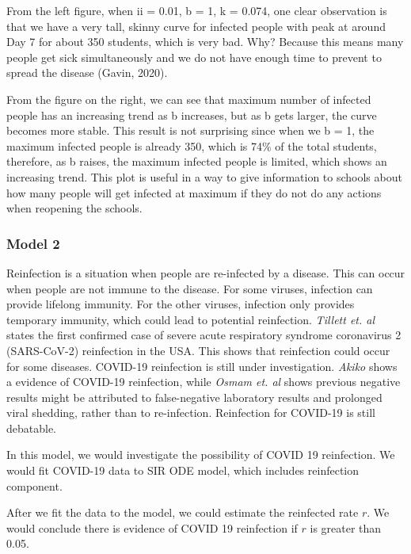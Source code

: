\documentclass[11pt,a4paper]{article}
\begin{document}
\medskip \noindent
From the left figure, when ii = 0.01, b = 1, k = 0.074, one clear observation is that we have a very tall, skinny curve for infected people with peak at around Day 7 for about 350 students, which is very bad. Why? Because this means many people get sick simultaneously and we do not have enough time to prevent to spread the disease (Gavin, 2020). 

\medskip \noindent
From the figure on the right, we can see that maximum number of infected people has an increasing trend as b increases, but as b gets larger, the curve becomes more stable. This result is not surprising since when we b = 1, the maximum infected people is already 350, which is 74\% of the total students, therefore, as b raises, the maximum infected people is limited, which shows an increasing trend. This plot is useful in a way to give information to schools about how many people will get infected at maximum if they do not do any actions when reopening the schools. 




\subsubsection*{Model 2}
Reinfection is a situation when people are re-infected by a disease. This can occur when people are not immune to the disease. For some viruses, infection can provide lifelong immunity. For the other viruses, infection only provides temporary immunity, which could lead to potential reinfection. \emph{Tillett et. al} states the first confirmed case of severe acute respiratory syndrome coronavirus 2 (SARS-CoV-2) reinfection in the USA. This shows that reinfection could occur for some diseases. COVID-19 reinfection is still under investigation. \emph{Akiko} shows a evidence of COVID-19 reinfection, while \emph{Osmam et. al} shows previous negative results might be attributed to false-negative laboratory results and prolonged viral shedding, rather than to re-infection. Reinfection for COVID-19 is still debatable.

\medskip \noindent
In this model, we would investigate the possibility of COVID 19 reinfection. We would fit COVID-19 data to SIR ODE model, which includes reinfection component. 

\medskip \noindent
After we fit the data to the model, we could estimate the reinfected rate $r$. We would conclude there is evidence of COVID 19 reinfection if $r$ is greater than 0.05. 
\end{document}

